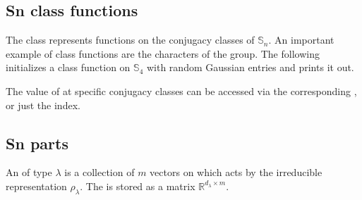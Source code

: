 \documentclass[letterpaper,10pt,english]{sphinxmanual}
\begin{document}
\subsection{Sn class functions}
\label{\detokenize{index:sn-class-functions}}
\sphinxAtStartPar
The class  represents functions on the conjugacy classes of \(\mathbb{S}_n\).
An important example of class functions are the characters of the group.
The following initializes a class function on \(\mathbb{S}_4\) with random Gaussian entries
and prints it out.

\begin{sphinxVerbatim}[commandchars=\\\{\}]
\end{sphinxVerbatim}

\sphinxAtStartPar
The value of  at specific conjugacy classes can be accessed via the corresponding ,
 or just the index.

\begin{sphinxVerbatim}[commandchars=\\\{\}]
\PYG{p}{[}\PYG{p}{[}\PYG{p}{]}\PYG{p}{]}
\PYG{p}{[}\PYG{p}{[}\PYG{p}{]}\PYG{p}{]}
\PYG{p}{[}\PYG{p}{]}
\end{sphinxVerbatim}


\subsection{Sn parts}
\label{\detokenize{index:sn-parts}}
\sphinxAtStartPar
An  of type \(\lambda\) is a collection of \(m\) vectors on which acts
by the irreducible representation \(\rho_\lambda\). The  is stored as a matrix
\(\mathbb{R}^{d_\lambda\times m}\).
\end{document}

